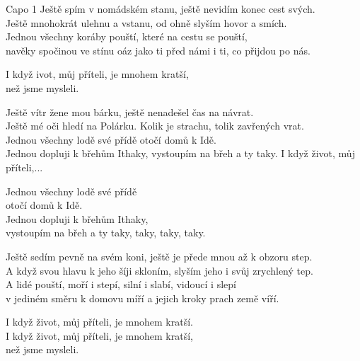 
\re{} Capo 1
\ve{}
Ještě spím v nomádském stanu, ještě nevidím konec cest svých.\\
Ještě mnohokrát ulehnu a vstanu, od ohně slyším hovor a smích.\\
Jednou všechny koráby pouští, které na cestu se pouští,\\
navěky spočinou ve stínu oáz jako ti před námi i ti, co přijdou po nás.

\re{*}
I když ivot, můj příteli, je mnohem kratší,\\
než jsme mysleli. 

\cho{}
Ještě vítr žene mou bárku, ještě nenadešel čas na návrat.\\
Ještě mé oči hledí na Polárku. Kolik je strachu, tolik zavřených vrat.\\
Jednou všechny lodě své přídě otočí domů k Idě.\\
Jednou dopluji k břehům Ithaky, vystoupím na břeh a ty taky.
\re{*}
I když život, můj příteli,...

\ve
Jednou všechny lodě své přídě\\
otočí domů k Idě.\\
Jednou dopluji k břehům Ithaky,\\
vystoupím na břeh a ty taky, taky, taky, taky.

\ve
Ještě sedím pevně na svém koni, ještě je přede mnou až k obzoru step.\\
A když svou hlavu k jeho šíji skloním, slyším jeho i svůj zrychlený tep.\\
A lidé pouští, moří i stepí, silní i slabí, vidoucí i slepí\\
v jediném směru k domovu míří a jejich kroky prach země víří.

\re{*}
I když život, můj příteli, je mnohem kratší.\\
I když život, můj příteli, je mnohem kratší,\\
než jsme mysleli.



\esong